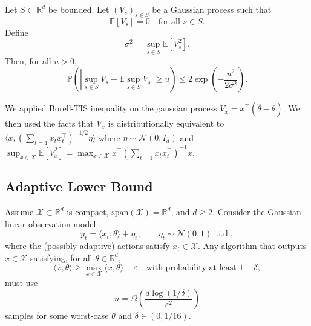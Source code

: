\begin{lemma}
Let $S \subset \mathbb{R}^d$ be bounded. Let $(V_s)_{s\in S}$ be a Gaussian process such that
\[
\mathbb{E}[V_s] = 0 \quad \text{for all } s \in S.
\]
Define
\[
\sigma^2 = \sup_{s\in S} \mathbb{E}[V_s^2].
\]
Then, for all $u > 0$,
\[
\mathbb{P}\!\left( \left| \sup_{s\in S} V_s - \mathbb{E}\!\sup_{s\in S} V_s \right| \ge u \right)
\le
2 \exp\!\left( -\frac{u^2}{2\sigma^2} \right).
\]
\end{lemma}
We applied Borell-TIS inequality on the gaussian process $V_x=x^\top(\widehat{\theta}-\theta)$. We then used the facts that $V_x$ is distributionally equivalent to $\langle x,(\sum_{t=1}x_tx_t^\top)^{-1/2}\eta\rangle$ where $\eta\sim \mathcal{N}(0,I_d)$ and $ \sup_{x\in \mathcal{X}} \mathbb{E}[V_x^2]=\max_{x\in\mathcal{X}}x^\top(\sum_{t=1}x_tx_t^\top)^{-1}x .$
\subsection{Adaptive Lower Bound}\label{appendix:adaptive-lower-bound}

\begin{theorem}\label{thm:main}
Assume $\mathcal{X}\subset \mathbb{R}^d$ is compact, $\mathrm{span}(\mathcal X)=\mathbb{R}^d$, and $d\geq 2$.
Consider the Gaussian linear observation model
\[
y_t=\langle x_t,\theta\rangle + \eta_t,\qquad \eta_t\sim \mathcal{N}(0,1)\ \text{i.i.d.},
\]
where the (possibly adaptive) actions satisfy $x_t\in\mathcal{X}$.
Any algorithm that outputs $\widehat x\in\mathcal{X}$ satisfying, for all $\theta\in\mathbb{R}^d$,
\[
\langle \widehat x,\theta\rangle \ge \max_{x\in \mathcal X}\langle x,\theta\rangle-\varepsilon
\quad\text{with probability at least } 1-\delta,
\]
must use
\[
n=\Omega\!\left(\frac{d\log(1/\delta)}{\varepsilon^2}\right)
\]
samples for some worst-case $\theta$ and $\delta\in(0,1/16)$.
\end{theorem}

